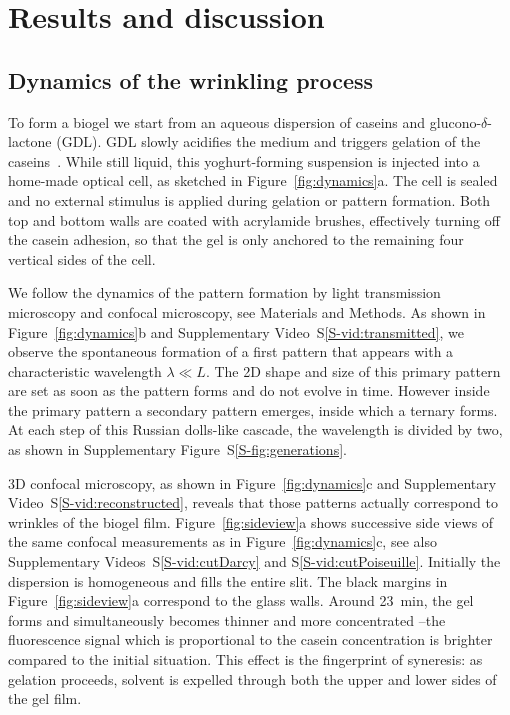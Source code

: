 \documentclass[twocolumn,superscriptaddress,showpacs,preprintnumbers, amsmath,amssymb,prl]{revtex4-1}
\begin{document}
\section*{Results and discussion}

\subsection*{Dynamics of the wrinkling process}

To form a biogel we start from an aqueous dispersion of caseins and glucono-$\delta$-lactone (GDL). GDL slowly acidifies the medium and triggers gelation of the caseins~\cite{Roefs1986,Bremer1989,Lucey1998,Dickinson2002}. While still liquid, this yoghurt-forming suspension is injected into a home-made optical cell, as sketched in Figure~\ref{fig:dynamics}a. The cell is sealed and no external stimulus is applied during gelation or pattern formation. Both top and bottom walls are coated with acrylamide brushes, effectively turning off the casein adhesion, so that the gel is only anchored to the remaining four vertical sides of the cell.

We follow the dynamics of the pattern formation by light transmission microscopy and confocal microscopy, see Materials and Methods. As shown in Figure~\ref{fig:dynamics}b and Supplementary Video~S\ref{S-vid:transmitted}, we observe the spontaneous formation of a first pattern that appears with a characteristic wavelength $\lambda\ll L$. The 2D shape and size of this primary pattern are set as soon as the pattern forms and do not evolve in time. However inside the primary pattern a secondary pattern emerges, inside which a ternary forms. At each step of this Russian dolls-like cascade, the wavelength is divided by two, as shown in Supplementary Figure~S\ref{S-fig:generations}.

3D confocal microscopy, as shown in Figure~\ref{fig:dynamics}c and Supplementary Video~S\ref{S-vid:reconstructed}, reveals that those patterns actually correspond to wrinkles of the biogel film. Figure~\ref{fig:sideview}a shows successive side views of the same confocal measurements as in  Figure~\ref{fig:dynamics}c, see also Supplementary Videos~S\ref{S-vid:cutDarcy} and S\ref{S-vid:cutPoiseuille}. Initially the dispersion is homogeneous and fills the entire slit. The black margins in Figure~\ref{fig:sideview}a correspond to the glass walls. Around \SI{23}{\minute}, the gel forms and simultaneously becomes thinner and more concentrated --the fluorescence signal which is proportional to the casein concentration is brighter compared to the initial situation. This effect is the fingerprint of syneresis: as gelation proceeds, solvent is expelled through both the upper and lower sides of the gel film.
\end{document}
